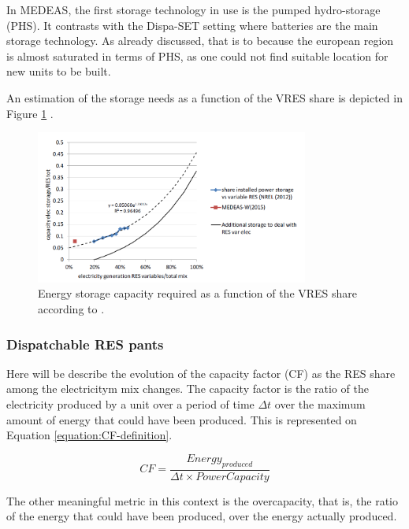 In MEDEAS, the first storage technology in use is the pumped hydro-storage (PHS). It contrasts with the Dispa-SET setting where batteries are the main storage technology. As already discussed, that is to because the european region is almost saturated in terms of PHS, as one could not find suitable location for new units to be built.

An estimation of the storage needs as a function of the VRES share is depicted in Figure \ref{fig:storage-vres} \cite{NREL}.

\begin{figure}[h]
    \includegraphics[width=0.8\textwidth]{resources/images/storage.png}
    \caption{Energy storage capacity required as a function of the VRES share according to \cite{NREL}.}
    \label{fig:storage-vres}
\end{figure}

\subsubsection{Dispatchable RES pants}

Here will be describe the evolution of the capacity factor (CF) as the RES share among the electricitym mix changes. The capacity factor is the ratio of the electricity produced by a unit over a period of time $\Delta t$ over the maximum amount of energy that could have been produced. This is represented on Equation \ref{equation:CF-definition}.


\begin{equation}
    CF = \frac{Energy_{produced}}{\Delta t \times PowerCapacity}
    \label{equation:CF-definition}
\end{equation}

The other meaningful metric in this context is the overcapacity, that is, the ratio of the energy that could have been produced, over the energy actually produced. %

